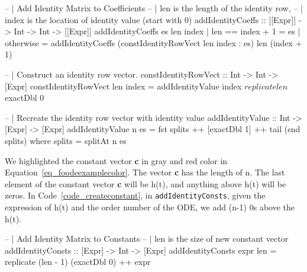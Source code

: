 \begin{listing}[ht]
\begin{haskell1}
-- | Add Identity Matrix to Coefficients
-- | len is the length of the identity row,
-- | index is the location of identity value (start with 0)
addIdentityCoeffs :: [[Expr]] -> Int -> Int -> [[Expr]]
addIdentityCoeffs es len index
  | len == index + 1 = es
  | otherwise = addIdentityCoeffs (constIdentityRowVect len index : es) len (index + 1)

-- | Construct an identity row vector.
constIdentityRowVect :: Int -> Int -> [Expr]
constIdentityRowVect len index = addIdentityValue index $ replicate len $ exactDbl 0

-- | Recreate the identity row vector with identity value 
addIdentityValue :: Int -> [Expr] -> [Expr]
addIdentityValue n es = fst splits ++ [exactDbl 1] ++ tail (snd splits)
  where splits = splitAt n es
\end{haskell1}
\label{code_createidentity}
\end{listing}

We highlighted the constant vector \textbf{c} in gray and red color in Equation~\ref{eq_foodeexamplecolor}. The vector \textbf{c} has the length of n. The last element of the constant vector \textbf{c} will be h(t), and anything above h(t) will be zeros. In Code~\ref{code_createconstant}, in \verb|addIdentityConsts|, given the expression of h(t) and the order number of the ODE, we add (n-1) 0s above the h(t). 

\begin{listing}[ht]
\begin{haskell1}
-- | Add Identity Matrix to Constants
-- | len is the size of new constant vector
addIdentityConsts :: [Expr] -> Int -> [Expr]
addIdentityConsts expr len = replicate (len - 1) (exactDbl 0) ++ expr
\end{haskell1}
\label{code_createconstant}
\end{listing}

